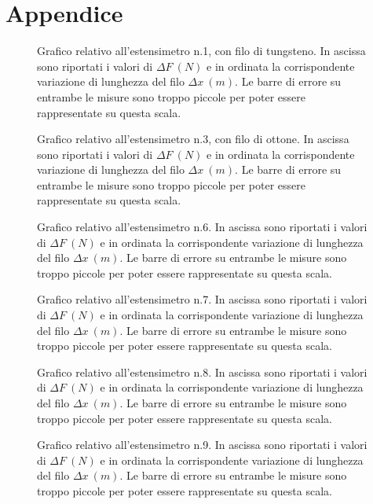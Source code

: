\documentclass[italian,a4paper]{article}
\begin{document}
\section{Appendice}
\centering
\begin{figure}[h]\caption{Grafico relativo all'estensimetro n.1, con filo di tungsteno. In ascissa sono riportati i valori di $\Delta F~(\unit{N})$ e in ordinata la corrispondente variazione di lunghezza del filo $\Delta x~(\unit{m})$. Le barre di errore su entrambe le misure sono troppo piccole per poter essere rappresentate su questa scala.}\label{1}

\end{figure}
\begin{figure}[p]\caption{Grafico relativo all'estensimetro n.3, con filo di ottone. In ascissa sono riportati i valori di $\Delta F~(\unit{N})$ e in ordinata la corrispondente variazione di lunghezza del filo $\Delta x~(\unit{m})$. Le barre di errore su entrambe le misure sono troppo piccole per poter essere rappresentate su questa scala.}\label{3}

\end{figure}
\begin{figure}[p]\caption{Grafico relativo all'estensimetro n.6. In ascissa sono riportati i valori di $\Delta F~(\unit{N})$ e in ordinata la corrispondente variazione di lunghezza del filo $\Delta x~(\unit{m})$. Le barre di errore su entrambe le misure sono troppo piccole per poter essere rappresentate su questa scala.}\label{6}

\end{figure}
\begin{figure}[p]\caption{Grafico relativo all'estensimetro n.7. In ascissa sono riportati i valori di $\Delta F~(\unit{N})$ e in ordinata la corrispondente variazione di lunghezza del filo $\Delta x~(\unit{m})$. Le barre di errore su entrambe le misure sono troppo piccole per poter essere rappresentate su questa scala.}\label{7}

\end{figure}
\begin{figure}[p]\caption{Grafico relativo all'estensimetro n.8. In ascissa sono riportati i valori di $\Delta F~(\unit{N})$ e in ordinata la corrispondente variazione di lunghezza del filo $\Delta x~(\unit{m})$. Le barre di errore su entrambe le misure sono troppo piccole per poter essere rappresentate su questa scala.}\label{8}

\end{figure}
\begin{figure}[p]\caption{Grafico relativo all'estensimetro n.9. In ascissa sono riportati i valori di $\Delta F~(\unit{N})$ e in ordinata la corrispondente variazione di lunghezza del filo $\Delta x~(\unit{m})$. Le barre di errore su entrambe le misure sono troppo piccole per poter essere rappresentate su questa scala.}\label{9}

\end{figure}
\end{document}
